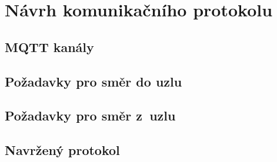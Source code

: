 \chapter{Návrh komunikačního protokolu}
\label{ch:protokol}

\section{MQTT kanály}

\section{Požadavky pro směr do uzlu}

\section{Požadavky pro směr z~uzlu}

\section{Navržený protokol}

